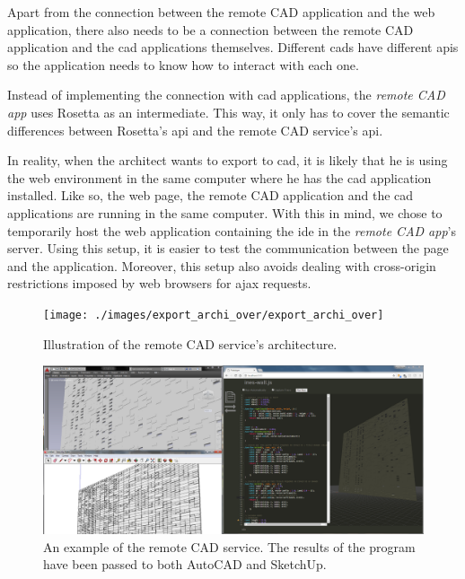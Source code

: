 Apart from the connection between the remote CAD application and the web application, there also needs to be a connection between the remote CAD application and the \gls{cad} applications themselves.
Different \glspl{cad} have different \glspl{api} so the application needs to know how to interact with each one.

Instead of implementing the connection with \gls{cad} applications, the \textit{remote CAD app} uses Rosetta as an intermediate.
This way, it only has to cover the semantic differences between Rosetta's \gls{api} and the remote CAD service's \gls{api}.

In reality, when the architect wants to export to \gls{cad}, it is likely that he is using the web environment in the same computer where he has the \gls{cad} application installed.
Like so, the web page, the remote CAD application and the \gls{cad} applications are running in the same computer.
With this in mind, we chose to temporarily host the web application containing the \gls{ide} in the \textit{remote CAD app}'s server.
Using this setup, it is easier to test the communication between the page and the application.
Moreover, this setup also avoids dealing with cross-origin restrictions imposed by web browsers for \gls{ajax} requests.

\begin{figure}
  \centering
  \texttt{[image: ./images/export\_archi\_over/export\_archi\_over]}
  \caption{Illustration of the remote CAD service's architecture.}
  \label{fig:remote:cad:archi}
\end{figure}


\begin{figure}
  \centering
  \includegraphics[width=1.0\textwidth]{./images/remote_cad_example/remote_cad_example}
  \caption[An example of the remote CAD service.]{An example of the remote CAD service. The results of the program have been passed to both AutoCAD and SketchUp.}
  \label{fig:remote:cad:example}
\end{figure}


